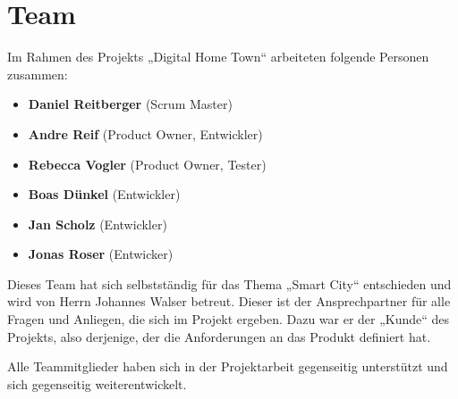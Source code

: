 \section{Team}
\label{sec:project-team}

Im Rahmen des Projekts „Digital Home Town“ arbeiteten folgende Personen zusammen:

\begin{itemize}
  \item \textbf{Daniel Reitberger} (Scrum Master)
  \item \textbf{Andre Reif} (Product Owner, Entwickler)
  \item \textbf{Rebecca Vogler} (Product Owner, Tester)
  \item \textbf{Boas Dünkel} (Entwickler)
  \item \textbf{Jan Scholz} (Entwickler)
  \item \textbf{Jonas Roser} (Entwicker)
\end{itemize}

Dieses Team hat sich selbstständig für das Thema „Smart City“ entschieden und wird von Herrn Johannes Walser betreut.
Dieser ist der Ansprechpartner für alle Fragen und Anliegen, die sich im Projekt ergeben.
Dazu war er der „Kunde“ des Projekts, also derjenige, der die Anforderungen an das Produkt definiert hat.

Alle Teammitglieder haben sich in der Projektarbeit gegenseitig unterstützt und sich gegenseitig weiterentwickelt.
